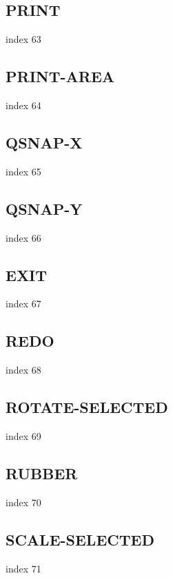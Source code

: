 \documentclass[a4paper]{report}
\begin{document}
\subsection{PRINT}

index 63

\subsection{PRINT-AREA}

index 64

\subsection{QSNAP-X}

index 65

\subsection{QSNAP-Y}

index 66

\subsection{EXIT}

 index 67

\subsection{REDO}

index 68

\subsection{ROTATE-SELECTED}

index 69

\subsection{RUBBER}

index 70

\subsection{SCALE-SELECTED}

index 71
\end{document}
